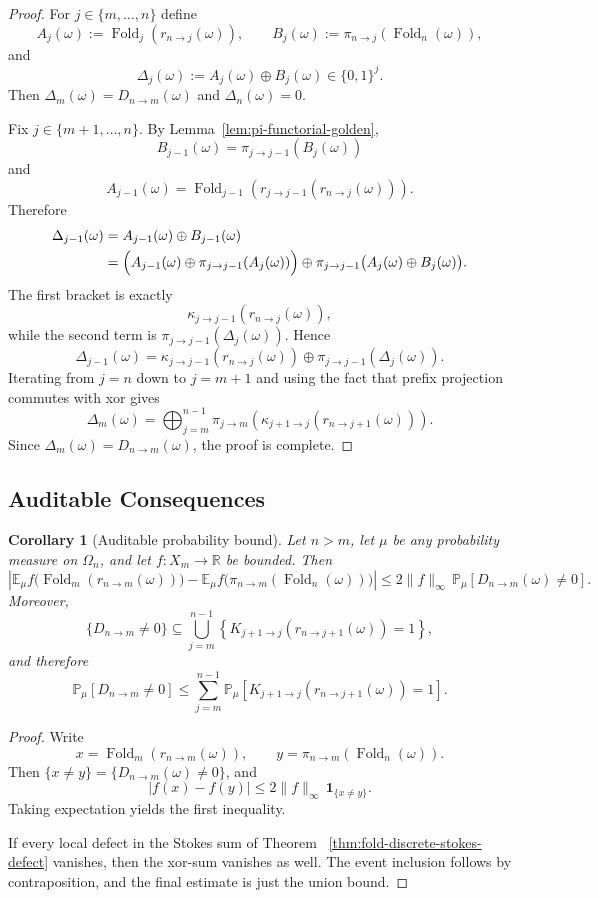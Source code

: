 \documentclass[11pt,letterpaper]{article}
\numberwithin{equation}{section}
\theoremstyle{plain}
\newtheorem{corollary}[theorem]{Corollary}
\theoremstyle{definition}
\theoremstyle{remark}
\newcommand{\RR}{\mathbb{R}}
\newcommand{\EE}{\mathbb{E}}
\newcommand{\PP}{\mathbb{P}}
\DeclareMathOperator{\Fold}{Fold}
\begin{document}
\begin{proof}
For $j\in\{m,\dots,n\}$ define
\[
A_j(\omega):=\Fold_j(r_{n\to j}(\omega)),
\qquad
B_j(\omega):=\pi_{n\to j}(\Fold_n(\omega)),
\]
and
\[
\Delta_j(\omega):=A_j(\omega)\oplus B_j(\omega)\in\{0,1\}^j.
\]
Then $\Delta_m(\omega)=D_{n\to m}(\omega)$ and $\Delta_n(\omega)=0$.

Fix $j\in\{m+1,\dots,n\}$.  By Lemma~\ref{lem:pi-functorial-golden},
\[
B_{j-1}(\omega)=\pi_{j\to j-1}(B_j(\omega))
\]
and
\[
A_{j-1}(\omega)=\Fold_{j-1}(r_{j\to j-1}(r_{n\to j}(\omega))).
\]
Therefore
\[
\begin{aligned}
\Delta_{j-1}(\omega)
&=A_{j-1}(\omega)\oplus B_{j-1}(\omega) \\
&=\Bigl(A_{j-1}(\omega)\oplus \pi_{j\to j-1}(A_j(\omega))\Bigr)
\oplus
\pi_{j\to j-1}\bigl(A_j(\omega)\oplus B_j(\omega)\bigr).
\end{aligned}
\]
The first bracket is exactly
\[
\kappa_{j\to j-1}(r_{n\to j}(\omega)),
\]
while the second term is $\pi_{j\to j-1}(\Delta_j(\omega))$.  Hence
\[
\Delta_{j-1}(\omega)
=
\kappa_{j\to j-1}(r_{n\to j}(\omega))
\oplus
\pi_{j\to j-1}(\Delta_j(\omega)).
\]
Iterating from $j=n$ down to $j=m+1$ and using the fact that prefix projection
commutes with xor gives
\[
\Delta_m(\omega)
=
\bigoplus_{j=m}^{n-1}
\pi_{j\to m}\!\left(
\kappa_{j+1\to j}(r_{n\to j+1}(\omega))
\right).
\]
Since $\Delta_m(\omega)=D_{n\to m}(\omega)$, the proof is complete.
\end{proof}

\subsection{Auditable Consequences}

\begin{corollary}[Auditable probability bound]
\label{cor:fold-discrete-stokes-auditable-bound}
Let $n>m$, let $\mu$ be any probability measure on $\Omega_n$, and let
$f:X_m\to\RR$ be bounded.  Then
\[
\left|
\EE_\mu f\bigl(\Fold_m(r_{n\to m}(\omega))\bigr)
-
\EE_\mu f\bigl(\pi_{n\to m}(\Fold_n(\omega))\bigr)
\right|
\le
2\lVert f\rVert_\infty\,
\PP_\mu[D_{n\to m}(\omega)\neq 0].
\]
Moreover,
\[
\{D_{n\to m}\neq 0\}
\subseteq
\bigcup_{j=m}^{n-1}
\left\{
K_{j+1\to j}(r_{n\to j+1}(\omega))=1
\right\},
\]
and therefore
\[
\PP_\mu[D_{n\to m}\neq 0]
\le
\sum_{j=m}^{n-1}
\PP_\mu\!\left[
K_{j+1\to j}(r_{n\to j+1}(\omega))=1
\right].
\]
\end{corollary}

\begin{proof}
Write
\[
x=\Fold_m(r_{n\to m}(\omega)),
\qquad
y=\pi_{n\to m}(\Fold_n(\omega)).
\]
Then $\{x\neq y\}=\{D_{n\to m}(\omega)\neq 0\}$, and
\[
\lvert f(x)-f(y)\rvert
\le
2\lVert f\rVert_\infty\,\mathbf{1}_{\{x\neq y\}}.
\]
Taking expectation yields the first inequality.

If every local defect in the Stokes sum of Theorem
~\ref{thm:fold-discrete-stokes-defect} vanishes, then the xor-sum vanishes as
well.  The event inclusion follows by contraposition, and the final estimate is
just the union bound.
\end{proof}
\end{document}
